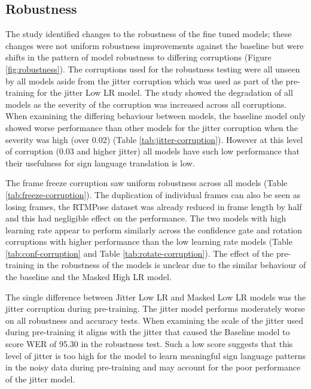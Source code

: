 \documentclass{article}
\begin{document}
\subsection{Robustness}
The study identified changes to the robustness of the fine tuned models; these changes were not uniform robustness improvements against the baseline but were shifts in the pattern of model robustness to differing corruptions (Figure \ref{fig:robustness}). The corruptions used for the robustness testing were all unseen by all models aside from the jitter corruption which was used as part of the pre-training for the jitter Low LR model. The study showed the degradation of all models as the severity of the corruption was increased across all corruptions. When examining the differing behaviour between models, the baseline model only showed worse performance than other models for the jitter corruption when the severity was high (over 0.02) (Table \ref{tab:jitter-corruption}). However at this level of corruption (0.03 and higher jitter) all models have such low performance that their usefulness for sign language translation is low. 

 The frame freeze corruption saw uniform robustness across all models (Table \ref{tab:freeze-corruption}). The duplication of individual frames can also be seen as losing frames, the RTMPose dataset was already reduced in frame length by half and this had negligible effect on the performance. The two models with high learning rate appear to perform similarly across the confidence gate and rotation corruptions with higher performance than the low learning rate models (Table \ref{tab:conf-corruption} and Table \ref{tab:rotate-corruption}). The effect of the pre-training in the robustness of the models is unclear due to the similar behaviour of the baseline and the Masked High LR model. 

The single difference between Jitter Low LR and Masked Low LR models was the jitter corruption during pre-training. The jitter model performs moderately worse on all robustness and accuracy tests. When examining the scale of the jitter used during pre-training it aligns with the jitter that caused the Baseline model to score WER of 95.30 in the robustness test. Such a low score suggests that this level of jitter is too high for the model to learn meaningful sign language patterns in the noisy data during pre-training and may account for the poor performance of the jitter model. 
\end{document}
